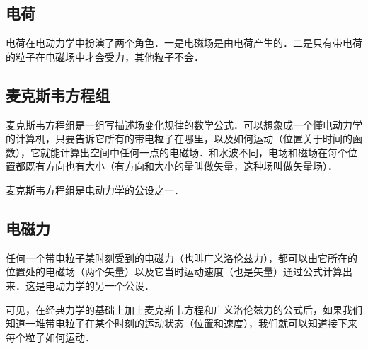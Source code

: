 \subsection{电荷}
电荷在电动力学中扮演了两个角色．一是电磁场是由电荷产生的．二是只有带电荷的粒子在电磁场中才会受力，其他粒子不会．

\subsection{麦克斯韦方程组}
麦克斯韦方程组是一组写描述场变化规律的数学公式．可以想象成一个懂电动力学的计算机，只要告诉它所有的带电粒子在哪里，以及如何运动（位置关于时间的函数），它就能计算出空间中任何一点的电磁场．和水波不同，电场和磁场在每个位置都既有方向也有大小（有方向和大小的量叫做矢量，这种场叫做矢量场）．

麦克斯韦方程组是电动力学的公设之一．

\subsection{电磁力}
任何一个带电粒子某时刻受到的电磁力（也叫广义洛伦兹力），都可以由它所在的位置处的电磁场（两个矢量）以及它当时运动速度（也是矢量）通过公式计算出来．这是电动力学的另一个公设．

可见，在经典力学的基础上加上麦克斯韦方程和广义洛伦兹力的公式后，如果我们知道一堆带电粒子在某个时刻的运动状态（位置和速度），我们就可以知道接下来每个粒子如何运动．
